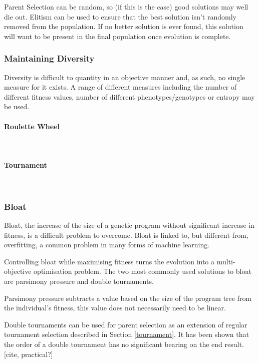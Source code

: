 \documentclass{article}
\newcommand{\myparagraph}[1]{\paragraph{#1}\mbox{}\\}
\begin{document}
Parent Selection can be random, so (if this is the case) good solutions may well die out. Elitism can be used to ensure that the best solution isn't randomly removed from the population. If no better solution is ever found, this solution will want to be present in the final population once evolution is complete.


\subsubsection{Maintaining Diversity}
Diversity is difficult to quantity in an objective manner and, as such, no single measure for it exists. A range of different measures including the number of different fitness values, number of different phenotypes/genotypes or entropy may be used\cite{textbook}.

\myparagraph{Roulette Wheel}

\myparagraph{Tournament}
\label{tournament}


\subsubsection{Bloat}%
Bloat, the increase of the size of a genetic program without significant increase in fitness, is a difficult problem to overcome. Bloat is linked to, but different from, overfitting, a common problem in many forms of machine learning\cite{overfitting_bloat}. %

Controlling bloat while maximising fitness turns the evolution into a multi-objective optimisation problem. The two most commonly used solutions to bloat are parsimony pressure and double tournaments.

Parsimony pressure subtracts a value based on the size of the program tree from the individual's fitness, this value does not necessarily need to be linear. %
\cite{parsimony_pressure}

Double tournaments can be used for parent selection as an extension of regular tournament selection described in Section \ref{tournament}.
It has been shown that the order of a double tournament has no significant bearing on the end result. [cite, practical?]
\end{document}
